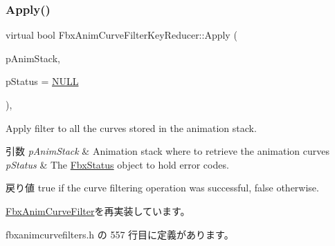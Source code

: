 \subsubsection{\texorpdfstring{Apply()}{Apply()}\hspace{0.1cm}{\footnotesize\ttfamily [1/5]}}
{\footnotesize\ttfamily virtual bool Fbx\+Anim\+Curve\+Filter\+Key\+Reducer\+::\+Apply (\begin{DoxyParamCaption}\item[{\hyperlink{class_fbx_anim_stack}{Fbx\+Anim\+Stack} $\ast$}]{p\+Anim\+Stack,  }\item[{\hyperlink{class_fbx_status}{Fbx\+Status} $\ast$}]{p\+Status = {\ttfamily \hyperlink{fbxarch_8h_a070d2ce7b6bb7e5c05602aa8c308d0c4}{N\+U\+LL}} }\end{DoxyParamCaption})\hspace{0.3cm}{\ttfamily [inline]}, {\ttfamily [virtual]}}

Apply filter to all the curves stored in the animation stack. 
\begin{DoxyParams}{引数}
{\em p\+Anim\+Stack} & Animation stack where to retrieve the animation curves \\
\hline
{\em p\+Status} & The \hyperlink{class_fbx_status}{Fbx\+Status} object to hold error codes. \\
\hline
\end{DoxyParams}
\begin{DoxyReturn}{戻り値}
{\ttfamily true} if the curve filtering operation was successful, {\ttfamily false} otherwise. 
\end{DoxyReturn}


\hyperlink{class_fbx_anim_curve_filter_aef3900e6180e05661c27ee484ae939c3}{Fbx\+Anim\+Curve\+Filter}を再実装しています。



 fbxanimcurvefilters.\+h の 557 行目に定義があります。

\mbox{\label{class_fbx_anim_curve_filter_key_reducer_ac9cd8a32e87c1589d0f245be377a3da3}} 
